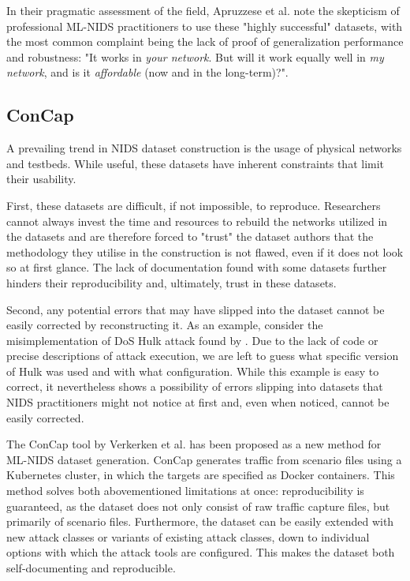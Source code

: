 In their pragmatic assessment of the field, Apruzzese et al. \cite{sok_nids_assessment} note the skepticism of professional ML-NIDS practitioners to use these "highly successful" datasets, with the most common complaint being the lack of proof of generalization performance and robustness: "It works in \textit{your network}. But will it work equally well in \textit{my network}, and is it \textit{affordable} (now and in the long-term)?".

\subsection{ConCap}
A prevailing trend in NIDS dataset construction is the usage of physical networks and testbeds. While useful, these datasets have inherent constraints that limit their usability. 

First, these datasets are difficult, if not impossible, to reproduce. Researchers cannot always invest the time and resources to rebuild the networks utilized in the datasets and are therefore forced to "trust" the dataset authors that the methodology they utilise in the construction is not flawed, even if it does not look so at first glance. The lack of documentation found with some datasets further hinders their reproducibility and, ultimately, trust in these datasets.

Second, any potential errors that may have slipped into the dataset cannot be easily corrected by reconstructing it. As an example, consider the misimplementation of DoS Hulk attack found by \cite{troubleshooting_cic2017}. Due to the lack of code or precise descriptions of attack execution, we are left to guess what specific version of Hulk was used and with what configuration. While this example is easy to correct, it nevertheless shows a possibility of errors slipping into datasets that NIDS practitioners might not notice at first and, even when noticed, cannot be easily corrected. 

The ConCap tool by Verkerken et al. \cite{concap} has been proposed as a new method for ML-NIDS dataset generation. ConCap generates traffic from scenario files using a Kubernetes cluster, in which the targets are specified as Docker containers. This method solves both abovementioned limitations at once: reproducibility is guaranteed, as the dataset does not only consist of raw traffic capture files, but primarily of scenario files. Furthermore, the dataset can be easily extended with new attack classes or variants of existing attack classes, down to individual options with which the attack tools are configured. This makes the dataset both self-documenting and reproducible.
